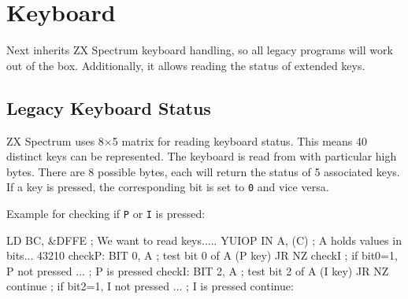 \section{Keyboard}
\label{zx_next_keyboard}


Next inherits ZX Spectrum keyboard handling, so all legacy programs will work out of the box. Additionally, it allows reading the status of extended keys.


\subsection{Legacy Keyboard Status}

ZX Spectrum uses 8$\times$5 matrix for reading keyboard status. This means 40 distinct keys can be represented. The keyboard is read from  with particular high bytes. There are 8 possible bytes, each will return the status of 5 associated keys. If a key is pressed, the corresponding bit is set to {\tt 0} and vice versa.

Example for checking if {\tt P} or {\tt I} is pressed:
	
\begin{tcblisting}{}
    LD BC, &DFFE     ; We want to read keys..... YUIOP
    IN A, (C)        ; A holds values in bits... 43210
checkP:
    BIT 0, A         ; test bit 0 of A (P key)
    JR NZ checkI     ; if bit0=1, P not pressed
    ...              ; P is pressed
checkI:
    BIT 2, A         ; test bit 2 of A (I key)
    JR NZ continue   ; if bit2=1, I not pressed
    ...              ; I is pressed
continue:
\end{tcblisting}

